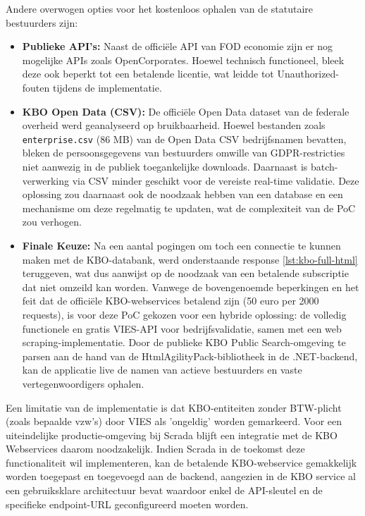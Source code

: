 Andere overwogen opties voor het kostenloos ophalen van de statutaire bestuurders zijn:
\begin{itemize}
    \item \textbf{Publieke API's:} Naast de officiële API van FOD economie zijn er nog mogelijke APIs zoals OpenCorporates. Hoewel technisch functioneel, bleek deze ook beperkt tot een betalende licentie, wat leidde tot Unauthorized-fouten tijdens de implementatie.
    \item \textbf{KBO Open Data (CSV):} De officiële Open Data dataset van de federale overheid werd geanalyseerd op bruikbaarheid. Hoewel bestanden zoals \texttt{enterprise.csv} (86 MB) van de Open Data CSV bedrijfsnamen bevatten, bleken de persoonsgegevens van bestuurders omwille van GDPR-restricties niet aanwezig in de publiek toegankelijke downloads. 
    Daarnaast is batch-verwerking via CSV minder geschikt voor de vereiste real-time validatie. Deze oplossing zou daarnaast ook de noodzaak hebben van een database en een mechanisme om deze regelmatig te updaten, wat de complexiteit van de PoC zou verhogen.
    \item \textbf{Finale Keuze:} Na een aantal pogingen om toch een connectie te kunnen maken met de KBO-databank, werd onderstaande response \ref{lst:kbo-full-html} teruggeven, wat dus aanwijst op de noodzaak van een betalende subscriptie dat niet omzeild kan worden. 
    Vanwege de bovengenoemde beperkingen en het feit dat de officiële KBO-webservices betalend zijn (50 euro per 2000 requests), is voor deze PoC gekozen voor een hybride oplossing: de volledig functionele en gratis VIES-API voor bedrijfsvalidatie, samen met een 
    web scraping-implementatie. Door de publieke KBO Public Search-omgeving te parsen aan de hand van de HtmlAgilityPack-bibliotheek in de .NET-backend, kan de applicatie live de namen van actieve bestuurders en vaste vertegenwoordigers ophalen. 

\end{itemize}

    Een limitatie van de implementatie is dat KBO-entiteiten zonder BTW-plicht (zoals bepaalde vzw's) 
    door VIES als 'ongeldig' worden gemarkeerd. Voor een uiteindelijke productie-omgeving bij Scrada blijft een integratie met de KBO Webservices daarom noodzakelijk.
    Indien Scrada in de toekomst deze functionaliteit wil implementeren, kan de betalende KBO-webservice gemakkelijk worden toegepast en toegevoegd aan de backend, aangezien in de KBO service al een gebruiksklare architectuur bevat waardoor enkel de API-sleutel en de specifieke endpoint-URL geconfigureerd moeten worden.

